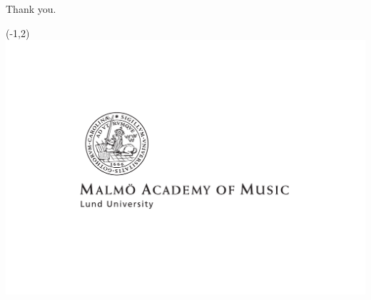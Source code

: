 \documentclass[]{beamer}
\begin{document}
\begin{frame}
   \frametitle{}
   \begin{block}{
       \begin{center}
       Thank you.
     \end{center}

}
   \end{block}
   \begin{textblock}{6}(-1,2)
     \includegraphics[width=\textwidth]{img/mhm-logo}
   \end{textblock}
\end{frame}
\end{document}
